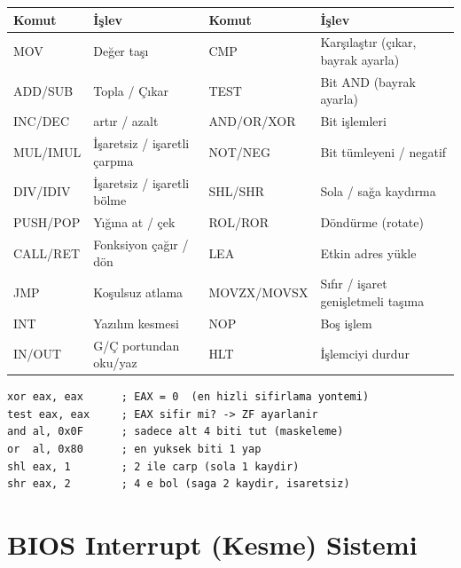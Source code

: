 \documentclass[11pt,a4paper]{article}
\begin{document}
\begin{center}
\small
\begin{tabularx}{\textwidth}{@{}l >{\raggedright\arraybackslash}X l >{\raggedright\arraybackslash}X@{}}
\toprule
\rowcolor{anaMavi}\color{white}\textbf{Komut} & \color{white}\textbf{İşlev} & \color{white}\textbf{Komut} & \color{white}\textbf{İşlev} \\
\midrule
MOV & Değer taşı & CMP & Karşılaştır (çıkar, bayrak ayarla) \\
\rowcolor{acikGri} ADD/SUB & Topla / Çıkar & TEST & Bit AND (bayrak ayarla) \\
INC/DEC & 1 artır / azalt & AND/OR/XOR & Bit işlemleri \\
\rowcolor{acikGri} MUL/IMUL & İşaretsiz / işaretli çarpma & NOT/NEG & Bit tümleyeni / negatif \\
DIV/IDIV & İşaretsiz / işaretli bölme & SHL/SHR & Sola / sağa kaydırma \\
\rowcolor{acikGri} PUSH/POP & Yığına at / çek & ROL/ROR & Döndürme (rotate) \\
CALL/RET & Fonksiyon çağır / dön & LEA & Etkin adres yükle \\
\rowcolor{acikGri} JMP & Koşulsuz atlama & MOVZX/MOVSX & Sıfır / işaret genişletmeli taşıma \\
INT & Yazılım kesmesi & NOP & Boş işlem \\
\rowcolor{acikGri} IN/OUT & G/Ç portundan oku/yaz & HLT & İşlemciyi durdur \\
\bottomrule
\end{tabularx}
\end{center}

\begin{ornekkutu}
\begin{lstlisting}
xor eax, eax      ; EAX = 0  (en hizli sifirlama yontemi)
test eax, eax     ; EAX sifir mi? -> ZF ayarlanir
and al, 0x0F      ; sadece alt 4 biti tut (maskeleme)
or  al, 0x80      ; en yuksek biti 1 yap
shl eax, 1        ; 2 ile carp (sola 1 kaydir)
shr eax, 2        ; 4 e bol (saga 2 kaydir, isaretsiz)
\end{lstlisting}
\end{ornekkutu}

\section{BIOS Interrupt (Kesme) Sistemi}
\end{document}
